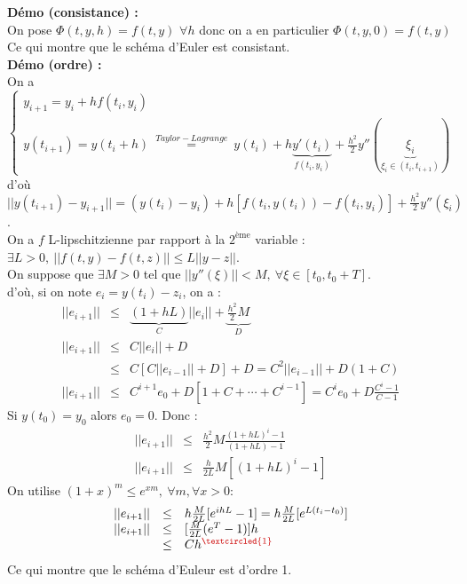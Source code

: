 \documentclass[a4paper,10pt]{report}
\begin{document}
\textbf{Démo (consistance) :}\\
\indent On pose $\Phi(t,y,h)=f(t,y)$ $\forall h$ donc on a en particulier $\Phi(t,y,0)=f(t,y)$\\
\indent Ce qui montre que le schéma d'Euler est consistant.\\

\textbf{Démo (ordre) :}\\
\indent On a $\left\{\begin{array}{l}y_{i+1}=y_i+hf(t_i,y_i)  \\
		y(t_{i+1})=y(t_i+h)\ \overset{Taylor-Lagrange}{=}\ y(t_i)+h\underbrace{y'(t_i)}_{f(t_i,y_i)}+\frac{h^2}{2}y''(\underbrace{\xi_i}			_{\xi_i\in(t_i,t_{i+1})})\end{array} \right.$\\
\indent d'où $||y(t_{i+1})-y_{i+1}||=(y(t_i)-y_i)+h[f(t_i,y(t_i))-f(t_i,y_i)]+\frac{h^2}{2}y''(\xi_i)$.\\
\indent On a $f$ L-lipschitzienne par rapport à la $2^{\text{ème}}$ variable :\\
\indent $\exists L>0,\ ||f(t,y)-f(t,z)||\leq L||y-z||$.\\
\indent On suppose que $\exists M>0$ tel que $||y''(\xi)||<M,\ \forall\xi\in[t_0,t_0+T]$.\\
\indent d'où, si on note $e_i=y(t_i)-z_i$, on a :
		$$\begin{array}{lll}
		||e_{i+1}||&\leq&\underbrace{(1+hL)}_{C}||e_i||+\underbrace{\frac{h^2}{2}M}_{D}\\
		||e_{i+1}||&\leq&C||e_i||+D\\
					&\leq&C[C||e_{i-1}||+D]+D=C^2||e_{i-1}||+D(1+C)\\
		||e_{i+1}||&\leq&C^{i+1}e_0+D[1+C+\cdots+C^{i-1}]=C^ie_0+D\frac{C^i-1}{C-1}
		\end{array}$$
\indent Si $y(t_0)=y_0$ alors $e_0=0$. Donc :
		$$\begin{array}{lll}
		||e_{i+1}||&\leq&\frac{h^2}{2}M\frac{(1+hL)^i-1}{(1+hL)-1}\\
		||e_{i+1}||&\leq&\frac{h}{2L}M[(1+hL)^i-1]
		\end{array}$$
\indent On utilise $(1+x)^m\leq e^{xm},\ \forall m,\forall x>0$:
		$$\begin{array}{lll}
		||e_{i+1}||&\leq&h\frac{M}{2L}[e^{ihL}-1]=h\frac{M}{2L}[e^{L(t_i-t_0)}]\\
		||e_{i+1}||&\leq&[\frac{M}{2L}(e^T-1)]h\\
					&\leq&Ch^{\textcolor{red}{\textcircled{\scriptsize 1}}}
		\end{array}$$
\indent Ce qui montre que le schéma d'Euleur est d'ordre 1.\\ \\
\end{document}
